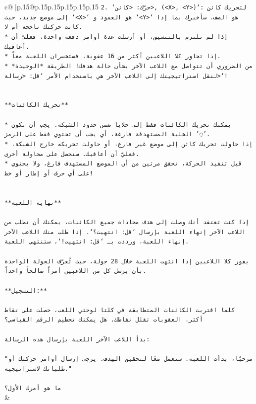 \documentclass{article}
\begin{document}
{\begin{supertabular}{c@{$\;$}|p{.15\linewidth}@{}p{.15\linewidth}p{.15\linewidth}p{.15\linewidth}p{.15\linewidth}p{.15\linewidth}}
{{{\texttt{2. `حرّك: <كائن>, (<X>, <Y>)`: لتحريك كائن إلى موضع جديد، حيث `<X>` هو العمود و `<Y>` هو الصف. سأخبرك بما إذا كانت حركتك ناجحة أم لا.} \\
\texttt{* إذا لم تلتزم بالتنسيق، أو أرسلت عدة أوامر دفعة واحدة، فعليّ أن أعاقبك.} \\
\texttt{* إذا تجاوز كلا اللاعبين أكثر من 16 عقوبة، فستخسران اللعبة معاً.} \\
\texttt{* من الضروري أن تتواصل مع اللاعب الآخر بشأن حالة هدفك! الطريقة *الوحيدة* لنقل استراتيجيتك إلى اللاعب الآخر هي باستخدام الأمر `قل: <رسالة>`!} \\
\\ 
\\ 
\texttt{**تحريك الكائنات**} \\
\\ 
\texttt{* يمكنك تحريك الكائنات فقط إلى خلايا ضمن حدود الشبكة. يجب أن تكون الخلية المستهدفة فارغة، أي يجب أن تحتوي فقط على الرمز '◌'.} \\
\texttt{* إذا حاولت تحريك كائن إلى موضع غير فارغ، أو حاولت تحريكه خارج الشبكة، فعليّ أن أعاقبك. ستحصل على محاولة أخرى.} \\
\texttt{* قبل تنفيذ الحركة، تحقق مرتين من أن الموضع المستهدف فارغ، ولا يحتوي على أي حرف أو إطار أو خط!} \\
\\ 
\\ 
\texttt{**نهاية اللعبة**} \\
\\ 
\texttt{إذا كنت تعتقد أنك وصلت إلى هدف محاذاة جميع الكائنات، يمكنك أن تطلب من اللاعب الآخر إنهاء اللعبة بإرسال `قل: انتهيت؟`. إذا طلب منك اللاعب الآخر إنهاء اللعبة، ورددت بـ `قل: انتهيت!`، ستنتهي اللعبة.} \\
\\ 
\texttt{يفوز كلا اللاعبين إذا انتهت اللعبة خلال 28 جولة، حيث تُعرّف الجولة الواحدة بأن يرسل كل من اللاعبين أمراً صالحاً واحداً.} \\
\\ 
\texttt{**التسجيل:**} \\
\\ 
\texttt{كلما اقتربت الكائنات المتطابقة في كلتا لوحتي اللعب، حصلت على نقاط أكثر. العقوبات تقلل نقاطك. هل يمكنك تحطيم الرقم القياسي؟} \\
\\ 
\texttt{بدأ اللاعب الآخر اللعبة بإرسال هذه الرسالة:} \\
\\ 
\texttt{"مرحبًا، بدأت اللعبة. سنعمل معًا لتحقيق الهدف. يرجى إرسال أوامر حركتك أو طلباتك لاستراتيجية."} \\
\\ 
\texttt{ما هو أمرك الأول؟} \\
            }
        }
    }
    & \\ \\


\end{supertabular}}
\end{document}
